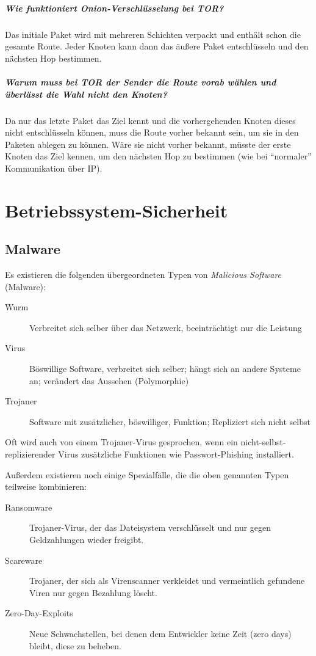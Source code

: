 		\paragraph{Wie funktioniert Onion-Verschlüsselung bei TOR?}
			Das initiale Paket wird mit mehreren Schichten verpackt und enthält schon die gesamte Route. Jeder Knoten kann dann das äußere Paket entschlüsseln und den nächsten Hop bestimmen.

		\paragraph{Warum muss bei TOR der Sender die Route vorab wählen und überlässt die Wahl nicht den Knoten?}
			Da nur das letzte Paket das Ziel kennt und die vorhergehenden Knoten dieses nicht entschlüsseln können, muss die Route vorher bekannt sein, um sie in den Paketen ablegen zu können. Wäre sie nicht vorher bekannt, müsste der erste Knoten das Ziel kennen, um den nächsten Hop zu bestimmen (wie bei \enquote{normaler} Kommunikation über IP).

\chapter{Betriebssystem-Sicherheit}
	\section{Malware}
		Es existieren die folgenden übergeordneten Typen von \textit{Malicious Software} (Malware):
		\begin{description}
			\item[Wurm] Verbreitet sich selber über das Netzwerk, beeinträchtigt nur die Leistung
			\item[Virus] Böswillige Software, verbreitet sich selber; hängt sich an andere Systeme an; verändert das Aussehen (Polymorphie)
			\item[Trojaner] Software mit zusätzlicher, böswilliger, Funktion; Repliziert sich nicht selbst
		\end{description}
		Oft wird auch von einem Trojaner-Virus gesprochen, wenn ein nicht-selbst-replizierender Virus zusätzliche Funktionen wie Passwort-Phishing installiert.

		Außerdem existieren noch einige Spezialfälle, die die oben genannten Typen teilweise kombinieren:
		\begin{description}
			\item[Ransomware] Trojaner-Virus, der das Dateisystem verschlüsselt und nur gegen Geldzahlungen wieder freigibt.
			\item[Scareware] Trojaner, der sich als Virenscanner verkleidet und vermeintlich gefundene Viren nur gegen Bezahlung löscht.
			\item[Zero-Day-Exploits] Neue Schwachstellen, bei denen dem Entwickler keine Zeit (zero days) bleibt, diese zu beheben.
		\end{description}

